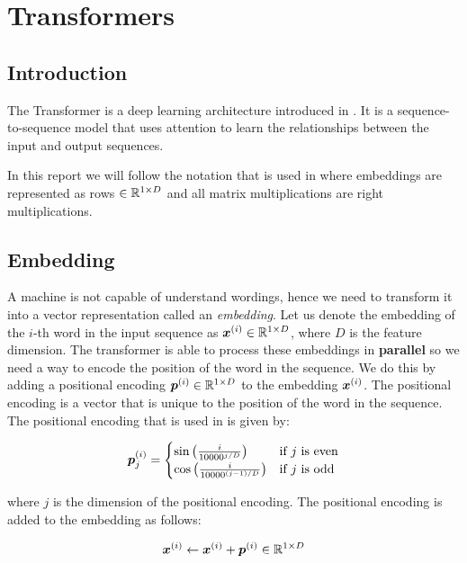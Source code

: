 \documentclass[../main.tex]{subfiles}
\begin{document}
\section{Transformers}
\subsection{Introduction}

The Transformer is a deep learning architecture introduced in \cite{vaswani2017attention}. It is a sequence-to-sequence model that uses attention to learn the relationships between the input and output sequences.

In this report we will follow the notation that is used in \cite{vaswani2017attention} where embeddings are represented as rows $\in \mathbb{R}^{1 \times D}$ and all matrix multiplications are right multiplications. 

\subsection{Embedding}

A machine is not capable of understand wordings, hence we need to transform it into a vector representation called an \emph{embedding}. Let us denote the embedding of the $i$-th word in the input sequence as $\bm{x}^{(i)} \in \mathbb{R}^{1 \times D}$, where $D$ is the feature dimension. The transformer is able to process these embeddings in \textbf{parallel} so we need a way to encode the position of the word in the sequence. We do this by adding a positional encoding $\bm{p}^{(i)} \in \mathbb{R}^{1 \times D}$ to the embedding $\bm{x}^{(i)}$. The positional encoding is a vector that is unique to the position of the word in the sequence. The positional encoding that is used in \cite{vaswani2017attention} is given by:

\begin{equation}
	\bm{p}_j^{(i)} = \begin{cases}
		\sin\left(\frac{i}{10000^{j/D}}\right) & \text{if } j \text{ is even} \\
		\cos\left(\frac{i}{10000^{(j-1)/D}}\right) & \text{if } j \text{ is odd}
	\end{cases}
\end{equation}

\noi where $j$ is the dimension of the positional encoding. The positional encoding is added to the embedding as follows:

\begin{equation}
	\bm{x}^{(i)} \leftarrow  \bm{x}^{(i)} + \bm{p}^{(i)} \in \mathbb{R}^{1 \times D}
\end{equation}
\end{document}
